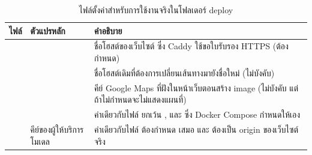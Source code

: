 \begin{table}[H]
\caption{ไฟล์ตั้งค่าสำหรับการใช้งานจริงในโฟลเดอร์ deploy}
\label{tab:deploy-env}
\centering
\begin{tabular}{|L{2.6cm}|L{4.6cm}|L{6cm}|}
\hline
\textbf{ไฟล์} & \textbf{ตัวแปรหลัก} & \textbf{คำอธิบาย} \\ \hline
{} &  & ชื่อโฮสต์ของเว็บไซต์ ซึ่ง Caddy ใช้ขอใบรับรอง HTTPS (ต้องกำหนด) \\
 &  & ชื่อโฮสต์เดิมที่ต้องการเปลี่ยนเส้นทางมายังชื่อใหม่ (ไม่บังคับ) \\
 &  & คีย์ Google Maps ที่ฝังในหน้าเว็บตอนสร้าง image (ไม่บังคับ แต่ถ้าไม่กำหนดจะไม่แสดงแผนที่) \\ \hline
{} & \newline{}\newline{}\newline{} & ค่าเดียวกับไฟล์  ยกเว้น ,  และ  ซึ่ง Docker Compose กำหนดให้เอง \\ \hline
{} & \newline{}\newline{}\newline{}\newline คีย์ของผู้ให้บริการโมเดล\newline{} & ค่าเดียวกับไฟล์  ต้องกำหนด  เสมอ และ  ต้องเป็น origin ของเว็บไซต์จริง \\ \hline
\end{tabular}
\end{table}

